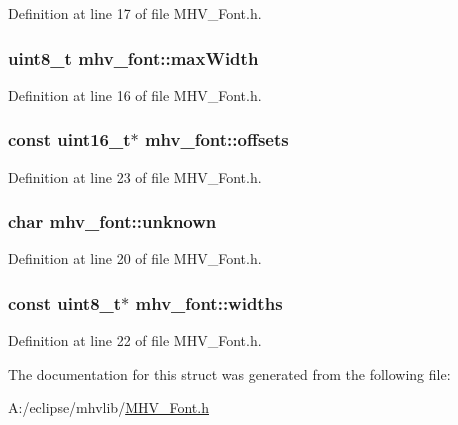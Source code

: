 \-Definition at line 17 of file \-M\-H\-V\-\_\-\-Font.\-h.

\hypertarget{structmhv__font_a21edb005a94690dc33615312f21640d0}{
\subsubsection[{max\-Width}]{\setlength{\rightskip}{0pt plus 5cm}uint8\-\_\-t {\bf mhv\-\_\-font\-::max\-Width}}}
\label{structmhv__font_a21edb005a94690dc33615312f21640d0}


\-Definition at line 16 of file \-M\-H\-V\-\_\-\-Font.\-h.

\hypertarget{structmhv__font_abf40bd8aecc79834ae9a010a25de1ecd}{
\subsubsection[{offsets}]{\setlength{\rightskip}{0pt plus 5cm}const uint16\-\_\-t$\ast$ {\bf mhv\-\_\-font\-::offsets}}}
\label{structmhv__font_abf40bd8aecc79834ae9a010a25de1ecd}


\-Definition at line 23 of file \-M\-H\-V\-\_\-\-Font.\-h.

\hypertarget{structmhv__font_a2df18aa9aae6fbbd346b07084eb7f5af}{
\subsubsection[{unknown}]{\setlength{\rightskip}{0pt plus 5cm}char {\bf mhv\-\_\-font\-::unknown}}}
\label{structmhv__font_a2df18aa9aae6fbbd346b07084eb7f5af}


\-Definition at line 20 of file \-M\-H\-V\-\_\-\-Font.\-h.

\hypertarget{structmhv__font_a27b1d6f8273b5c47331c56dc2fa99d39}{
\subsubsection[{widths}]{\setlength{\rightskip}{0pt plus 5cm}const uint8\-\_\-t$\ast$ {\bf mhv\-\_\-font\-::widths}}}
\label{structmhv__font_a27b1d6f8273b5c47331c56dc2fa99d39}


\-Definition at line 22 of file \-M\-H\-V\-\_\-\-Font.\-h.



\-The documentation for this struct was generated from the following file\-:\begin{DoxyCompactItemize}
\item 
\-A\-:/eclipse/mhvlib/\hyperlink{_m_h_v___font_8h}{\-M\-H\-V\-\_\-\-Font.\-h}\end{DoxyCompactItemize}
